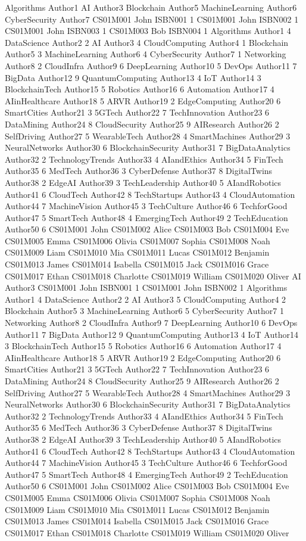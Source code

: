 Algorithms Author1
AI Author3
Blockchain Author5
MachineLearning Author6
CyberSecurity Author7
CS01M001 John ISBN001 1
CS01M001 John ISBN002 1
CS01M001 John ISBN003 1
CS01M003 Bob ISBN004 1
Algorithms Author1 4
DataScience Author2 2
AI Author3 4
CloudComputing Author4 1
Blockchain Author5 3
MachineLearning Author6 4
CyberSecurity Author7 1
Networking Author8 2
CloudInfra Author9 6
DeepLearning Author10 5
DevOps Author11 7
BigData Author12 9
QuantumComputing Author13 4
IoT Author14 3
BlockchainTech Author15 5
Robotics Author16 6
Automation Author17 4
AIinHealthcare Author18 5
ARVR Author19 2
EdgeComputing Author20 6
SmartCities Author21 3
5GTech Author22 7
TechInnovation Author23 6
DataMining Author24 8
CloudSecurity Author25 9
AIResearch Author26 2
SelfDriving Author27 5
WearableTech Author28 4
SmartMachines Author29 3
NeuralNetworks Author30 6
BlockchainSecurity Author31 7
BigDataAnalytics Author32 2
TechnologyTrends Author33 4
AIandEthics Author34 5
FinTech Author35 6
MedTech Author36 3
CyberDefense Author37 8
DigitalTwins Author38 2
EdgeAI Author39 3
TechLeadership Author40 5
AIandRobotics Author41 6
CloudTech Author42 8
TechStartups Author43 4
CloudAutomation Author44 7
MachineVision Author45 3
TechCulture Author46 6
TechforGood Author47 5
SmartTech Author48 4
EmergingTech Author49 2
TechEducation Author50 6
CS01M001 John
CS01M002 Alice
CS01M003 Bob
CS01M004 Eve
CS01M005 Emma
CS01M006 Olivia
CS01M007 Sophia
CS01M008 Noah
CS01M009 Liam
CS01M010 Mia
CS01M011 Lucas
CS01M012 Benjamin
CS01M013 James
CS01M014 Isabella
CS01M015 Jack
CS01M016 Grace
CS01M017 Ethan
CS01M018 Charlotte
CS01M019 William
CS01M020 Oliver
AI Author3
CS01M001 John ISBN001 1
CS01M001 John ISBN002 1
Algorithms Author1 4
DataScience Author2 2
AI Author3 5
CloudComputing Author4 2
Blockchain Author5 3
MachineLearning Author6 5
CyberSecurity Author7 1
Networking Author8 2
CloudInfra Author9 7
DeepLearning Author10 6
DevOps Author11 7
BigData Author12 9
QuantumComputing Author13 4
IoT Author14 3
BlockchainTech Author15 5
Robotics Author16 6
Automation Author17 4
AIinHealthcare Author18 5
ARVR Author19 2
EdgeComputing Author20 6
SmartCities Author21 3
5GTech Author22 7
TechInnovation Author23 6
DataMining Author24 8
CloudSecurity Author25 9
AIResearch Author26 2
SelfDriving Author27 5
WearableTech Author28 4
SmartMachines Author29 3
NeuralNetworks Author30 6
BlockchainSecurity Author31 7
BigDataAnalytics Author32 2
TechnologyTrends Author33 4
AIandEthics Author34 5
FinTech Author35 6
MedTech Author36 3
CyberDefense Author37 8
DigitalTwins Author38 2
EdgeAI Author39 3
TechLeadership Author40 5
AIandRobotics Author41 6
CloudTech Author42 8
TechStartups Author43 4
CloudAutomation Author44 7
MachineVision Author45 3
TechCulture Author46 6
TechforGood Author47 5
SmartTech Author48 4
EmergingTech Author49 2
TechEducation Author50 6
CS01M001 John
CS01M002 Alice
CS01M003 Bob
CS01M004 Eve
CS01M005 Emma
CS01M006 Olivia
CS01M007 Sophia
CS01M008 Noah
CS01M009 Liam
CS01M010 Mia
CS01M011 Lucas
CS01M012 Benjamin
CS01M013 James
CS01M014 Isabella
CS01M015 Jack
CS01M016 Grace
CS01M017 Ethan
CS01M018 Charlotte
CS01M019 William
CS01M020 Oliver